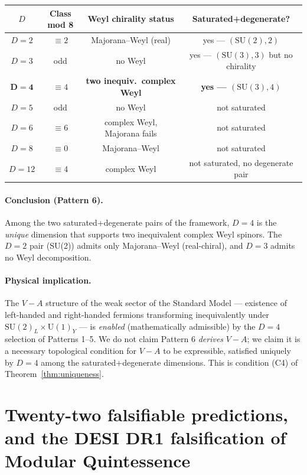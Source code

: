 \documentclass[11pt,a4paper]{article}
\newcommand{\SU}{\mathrm{SU}}
\newcommand{\Uone}{\mathrm{U}(1)}
\begin{document}
\begin{center}
\begin{tabular}{cccc}
\toprule
$D$ & Class mod 8 & Weyl chirality status & Saturated+degenerate? \\
\midrule
$D = 2$ & $\equiv 2$ & Majorana--Weyl (real) & yes --- $(\SU(2), 2)$ \\
$D = 3$ & odd & no Weyl & yes --- $(\SU(3), 3)$ but no chirality \\
$\mathbf{D = 4}$ & $\equiv 4$ & \textbf{two inequiv.\ complex Weyl} & \textbf{yes --- $(\SU(3), 4)$} \\
$D = 5$ & odd & no Weyl & not saturated \\
$D = 6$ & $\equiv 6$ & complex Weyl, Majorana fails & not saturated \\
$D = 8$ & $\equiv 0$ & Majorana--Weyl & not saturated \\
$D = 12$ & $\equiv 4$ & complex Weyl & not saturated, no degenerate pair \\
\bottomrule
\end{tabular}
\end{center}

\paragraph{Conclusion (Pattern 6).} Among the two saturated+degenerate pairs of the framework, $D = 4$ is the \emph{unique} dimension that supports two inequivalent complex Weyl spinors. The $D = 2$ pair (SU(2)) admits only Majorana--Weyl (real-chiral), and $D = 3$ admits no Weyl decomposition.

\paragraph{Physical implication.} The $V - A$ structure of the weak sector of the Standard Model --- existence of left-handed and right-handed fermions transforming inequivalently under $\SU(2)_L \times \Uone_Y$ --- is \emph{enabled} (mathematically admissible) by the $D = 4$ selection of Patterns 1--5. We do not claim Pattern 6 \emph{derives} $V - A$; we claim it is a necessary topological condition for $V - A$ to be expressible, satisfied uniquely by $D = 4$ among the saturated+degenerate dimensions. This is condition (C4) of Theorem~\ref{thm:uniqueness}.

\section{Twenty-two falsifiable predictions, and the DESI DR1 falsification of Modular Quintessence}\label{sec:cosmo}
\end{document}
